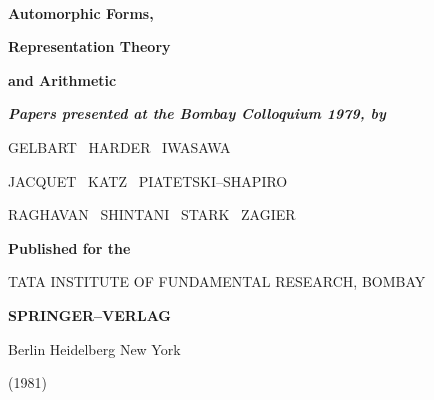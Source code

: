 \vfill\eject


\thispagestyle{empty}

~

\begin{center}
{\Large\bf Automorphic Forms,}

{\Large\bf Representation Theory}

{\Large\bf and Arithmetic}
\end{center}

\vskip 1cm

\begin{center}
{\textit\bfseries Papers presented at the Bombay Colloquium 1979, by}
\end{center}

\smallskip

\begin{center}
GELBART \ HARDER \ IWASAWA

JACQUET \ KATZ \ PIATETSKI--SHAPIRO

RAGHAVAN \ SHINTANI \ STARK \ ZAGIER

\vfill

{\bf Published for the}
\medskip

\textsc{TATA INSTITUTE OF FUNDAMENTAL RESEARCH, BOMBAY}

\vskip 1cm

{\large\bf SPRINGER--VERLAG }

\smallskip

Berlin Heidelberg New York

(1981)
\end{center}


\newpage

~\phantom{a}

\thispagestyle{empty}

\vfill

